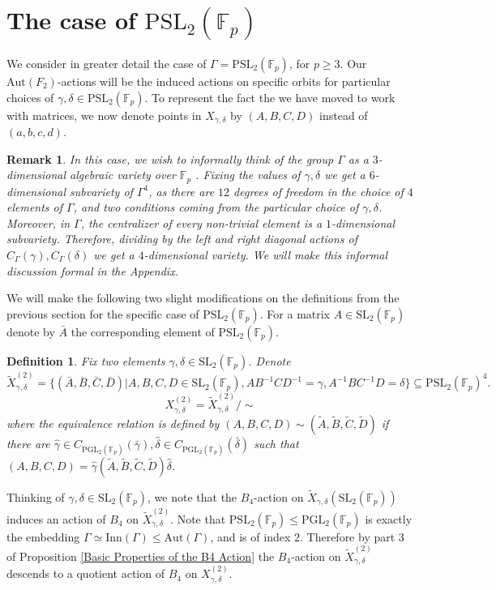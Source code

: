 \documentclass[letterpaper]{amsart}
\newtheorem{definition}[theorem]{Definition}
\newtheorem{remark}[theorem]{Remark}
\begin{document}
\section{The case of $\mathrm{PSL}_2(\mathbb{F}_p)$}
We consider in greater detail the case of $\Gamma = \mathrm{PSL}_2(\mathbb{F}_p)$, for $p\geq 3$. Our $\mathrm{Aut}(F_2)$-actions will be the induced actions on specific orbits for particular choices of $\gamma,\delta \in \mathrm{PSL}_2(\mathbb{F}_p)$. 
To represent the fact the we have moved to work with matrices, we now denote points in $X_{\gamma,\delta}$ by $(A,B,C,D)$ instead of $(a,b,c,d)$.

\begin{remark}
In this case, we wish to informally think of the group $\Gamma$ as a $3$-dimensional algebraic variety over $\mathbb{F}_p$ . Fixing the values of $\gamma,\delta$ we get a $6$-dimensional subvariety of $\Gamma^4$, as there are $12$ degrees of freedom in the choice of $4$ elements of $\Gamma$, and two conditions coming from the particular choice of $\gamma,\delta$. Moreover, in $\Gamma$, the centralizer of every non-trivial element is a $1$-dimensional subvariety. Therefore, dividing by the left and right diagonal actions of $C_\Gamma(\gamma),C_\Gamma(\delta)$ we get a $4$-dimensional variety. We will make this informal discussion formal in the Appendix.
\end{remark}
We will make the following two slight modifications on the definitions from the previous section for the specific case of $\mathrm{PSL}_2(\mathbb{F}_p)$. For a matrix $A \in \mathrm{SL}_2(\mathbb{F}_p)$ denote by $\bar{A}$ the corresponding element of $\mathrm{PSL}_2(\mathbb{F}_p)$.
\begin{definition}
Fix two elements $\gamma,\delta \in \mathrm{SL}_2(\mathbb{F}_p)$. Denote
$$\tilde{X}_{\gamma,\delta}^{(2)} = \{(\bar{A},\bar{B},\bar{C},\bar{D})| A,B,C,D \in \mathrm{SL}_2(\mathbb{F}_p), AB^{-1}CD^{-1} = \gamma, A^{-1}BC^{-1}D = \delta\} \subseteq \mathrm{PSL}_2(\mathbb{F}_p)^4.$$
$$X_{\gamma,\delta}^{(2)} = \tilde{X}_{\gamma, \delta}^{(2)} / \sim$$
where the equivalence relation is defined by $(A,B,C,D) \sim (\tilde{A}, \tilde{B}, \tilde{C}, \tilde{D})$ if there are $\hat{\gamma} \in C_{\mathrm{PGL}_2(\mathbb{F}_p)}(\bar{\gamma}),\hat{\delta} \in C_{\mathrm{PGL}_2(\mathbb{F}_p)}(\bar{\delta})$ such that $(A,B,C,D) = \hat{\gamma}(\tilde{A},\tilde{B}, \tilde{C},\tilde{D})\hat{\delta}$.
\end{definition}

Thinking of $\gamma, \delta \in \mathrm{SL}_2(\mathbb{F}_p)$, we note that the $B_4$-action on $\tilde{X}_{\gamma,\delta}(\mathrm{SL}_2(\mathbb{F}_p))$ induces an action of $B_4$ on $\tilde{X}_{\gamma,\delta}^{(2)}$. Note that $\mathrm{PSL}_2(\mathbb{F}_p) \leq \mathrm{PGL_2}(\mathbb{F}_p)$ is exactly the embedding $\Gamma \simeq \mathrm{Inn}(\Gamma) \leq \mathrm{Aut}(\Gamma)$, and is of index $2.$ Therefore by part $3$ of Proposition \ref{Basic Properties of the B4 Action} the $B_4$-action on $\tilde{X}_{\gamma,\delta}^{(2)}$ descends to a quotient action of $B_4$ on $X_{\gamma,\delta}^{(2)}$.
\end{document}
